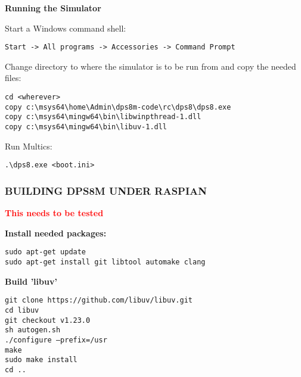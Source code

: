 \textbf{Running the Simulator}

Start a Windows command shell:

\begin{adjustwidth}{5ex}{1ex}
    \texttt{Start -> All programs -> Accessories -> Command Prompt} \\
\end{adjustwidth}

Change directory to where the simulator is to be run from and copy the needed files:

\begin{adjustwidth}{5ex}{1ex}
    \texttt{cd <wherever>} \\
    \texttt{copy c:\textbackslash{}msys64\textbackslash{}home\textbackslash{}Admin\textbackslash{}dps8m-code\textbackslash{}rc\textbackslash{}dps8\textbackslash{}dps8.exe} \\
    \texttt{copy c:\textbackslash{}msys64\textbackslash{}mingw64\textbackslash{}bin\textbackslash{}libwinpthread-1.dll} \\
    \texttt{copy c:\textbackslash{}msys64\textbackslash{}mingw64\textbackslash{}bin\textbackslash{}libuv-1.dll} \\
\end{adjustwidth}

Run Multics:

\begin{adjustwidth}{5ex}{1ex}
    \texttt{.\textbackslash{}dps8.exe <boot.ini>} \\
\end{adjustwidth}

\newpage

\subsubsection[Building dps8m under Raspbian]{BUILDING DPS8M UNDER RASPIAN}

\textbf{\textcolor{red}{This needs to be tested}}

\textbf{Install needed packages:}

\begin{adjustwidth}{5ex}{1ex}
	\texttt{sudo apt-get update} \\
    \texttt{sudo apt-get install git libtool automake clang}
\end{adjustwidth}

\textbf{Build 'libuv'}

\begin{adjustwidth}{5ex}{1ex}
    \texttt{git clone https://github.com/libuv/libuv.git} \\
    \texttt{cd libuv} \\
    \texttt{git checkout v1.23.0} \\
    \texttt{sh autogen.sh} \\
    \texttt{./configure --prefix=/usr} \\
    \texttt{make} \\
    \texttt{sudo make install} \\
    \texttt{cd ..} \\
\end{adjustwidth}

